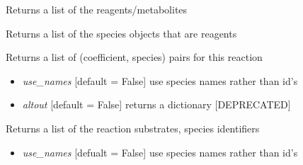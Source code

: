 \documentclass[a4paper,11pt,english]{sphinxmanual}
\begin{document}
\begin{fulllineitems}

\begin{fulllineitems}
\label{modules_doc:cbmpy.CBModel.Reaction.getSpeciesIds}
Returns a list of the reagents/metabolites

\end{fulllineitems}


\begin{fulllineitems}
\label{modules_doc:cbmpy.CBModel.Reaction.getSpeciesObj}
Returns a list of the species objects that are reagents

\end{fulllineitems}


\begin{fulllineitems}
\label{modules_doc:cbmpy.CBModel.Reaction.getStoichiometry}
Returns a list of (coefficient, species) pairs for this reaction
\begin{itemize}
\item {} 
\emph{use\_names} {[}default = False{]} use species names rather than id's

\item {} 
\emph{altout} {[}default = False{]} returns a dictionary {[}DEPRECATED{]}

\end{itemize}

\end{fulllineitems}


\begin{fulllineitems}
\label{modules_doc:cbmpy.CBModel.Reaction.getSubstrateIds}
Returns a list of the reaction substrates, species identifiers
\begin{itemize}
\item {} 
\emph{use\_names} {[}defualt = False{]} use species names rather than id's

\end{itemize}


\end{fulllineitems}
\end{fulllineitems}
\end{document}
